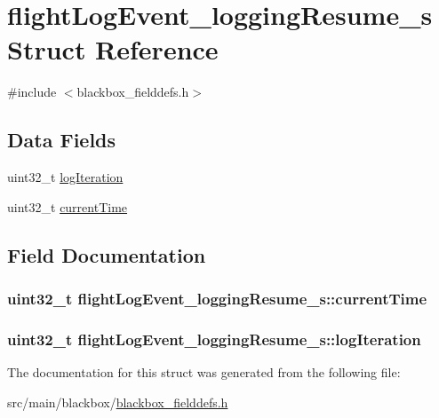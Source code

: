 \hypertarget{structflightLogEvent__loggingResume__s}{\section{flight\+Log\+Event\+\_\+logging\+Resume\+\_\+s Struct Reference}
\label{structflightLogEvent__loggingResume__s}
}


{\ttfamily \#include $<$blackbox\+\_\+fielddefs.\+h$>$}

\subsection*{Data Fields}
\begin{DoxyCompactItemize}
\item 
uint32\+\_\+t \hyperlink{structflightLogEvent__loggingResume__s_a47561301c441cf5f0bab97c811dbbfaa}{log\+Iteration}
\item 
uint32\+\_\+t \hyperlink{structflightLogEvent__loggingResume__s_ab3ecc89a25bf7e15f4466f092fe7cbf0}{current\+Time}
\end{DoxyCompactItemize}


\subsection{Field Documentation}
\hypertarget{structflightLogEvent__loggingResume__s_ab3ecc89a25bf7e15f4466f092fe7cbf0}{
\subsubsection[{current\+Time}]{\setlength{\rightskip}{0pt plus 5cm}uint32\+\_\+t flight\+Log\+Event\+\_\+logging\+Resume\+\_\+s\+::current\+Time}}\label{structflightLogEvent__loggingResume__s_ab3ecc89a25bf7e15f4466f092fe7cbf0}
\hypertarget{structflightLogEvent__loggingResume__s_a47561301c441cf5f0bab97c811dbbfaa}{
\subsubsection[{log\+Iteration}]{\setlength{\rightskip}{0pt plus 5cm}uint32\+\_\+t flight\+Log\+Event\+\_\+logging\+Resume\+\_\+s\+::log\+Iteration}}\label{structflightLogEvent__loggingResume__s_a47561301c441cf5f0bab97c811dbbfaa}


The documentation for this struct was generated from the following file\+:\begin{DoxyCompactItemize}
\item 
src/main/blackbox/\hyperlink{blackbox__fielddefs_8h}{blackbox\+\_\+fielddefs.\+h}\end{DoxyCompactItemize}
